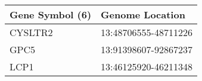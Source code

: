 \begin{tabular}{ll}
\toprule
Gene Symbol (6) &      Genome Location \\
\midrule
        CYSLTR2 & 13:48706555-48711226 \\
           GPC5 & 13:91398607-92867237 \\
           LCP1 & 13:46125920-46211348 \\
\bottomrule
\end{tabular}
